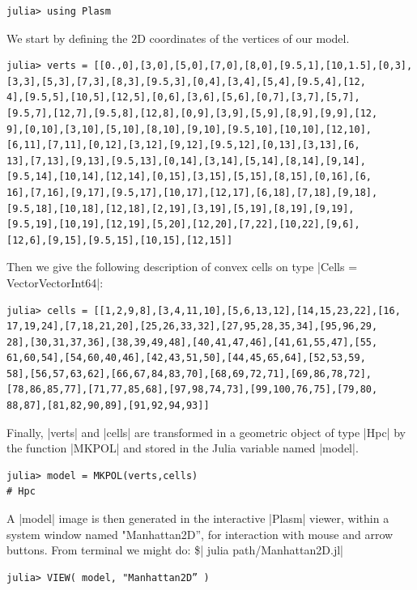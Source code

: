 \begin{coding}
\begin{lstlisting}[language=JuliaLocal, style=julia, mathescape = true] 
julia> using Plasm
\end{lstlisting} 

We start by defining the 2D coordinates of the vertices of our model. 
\begin{lstlisting}[language=JuliaLocal, style=julia, mathescape = true] 
julia> verts = [[0.,0],[3,0],[5,0],[7,0],[8,0],[9.5,1],[10,1.5],[0,3],
[3,3],[5,3],[7,3],[8,3],[9.5,3],[0,4],[3,4],[5,4],[9.5,4],[12,
4],[9.5,5],[10,5],[12,5],[0,6],[3,6],[5,6],[0,7],[3,7],[5,7],
[9.5,7],[12,7],[9.5,8],[12,8],[0,9],[3,9],[5,9],[8,9],[9,9],[12,
9],[0,10],[3,10],[5,10],[8,10],[9,10],[9.5,10],[10,10],[12,10],
[6,11],[7,11],[0,12],[3,12],[9,12],[9.5,12],[0,13],[3,13],[6,
13],[7,13],[9,13],[9.5,13],[0,14],[3,14],[5,14],[8,14],[9,14],
[9.5,14],[10,14],[12,14],[0,15],[3,15],[5,15],[8,15],[0,16],[6,
16],[7,16],[9,17],[9.5,17],[10,17],[12,17],[6,18],[7,18],[9,18],
[9.5,18],[10,18],[12,18],[2,19],[3,19],[5,19],[8,19],[9,19],
[9.5,19],[10,19],[12,19],[5,20],[12,20],[7,22],[10,22],[9,6],
[12,6],[9,15],[9.5,15],[10,15],[12,15]]
\end{lstlisting}
Then we give the following description of convex cells on type |Cells = Vector{Vector{Int64}}|:
\begin{lstlisting}[language=JuliaLocal, style=julia, mathescape = true] 
julia> cells = [[1,2,9,8],[3,4,11,10],[5,6,13,12],[14,15,23,22],[16,
17,19,24],[7,18,21,20],[25,26,33,32],[27,95,28,35,34],[95,96,29,
28],[30,31,37,36],[38,39,49,48],[40,41,47,46],[41,61,55,47],[55,
61,60,54],[54,60,40,46],[42,43,51,50],[44,45,65,64],[52,53,59,
58],[56,57,63,62],[66,67,84,83,70],[68,69,72,71],[69,86,78,72],
[78,86,85,77],[71,77,85,68],[97,98,74,73],[99,100,76,75],[79,80,
88,87],[81,82,90,89],[91,92,94,93]]
\end{lstlisting}
Finally, |verts|  and |cells| are transformed in a geometric object of type |Hpc| 
by the function |MKPOL| and stored in the Julia variable named |model|.

\begin{lstlisting}[language=JuliaLocal, style=julia, mathescape = true] 
julia> model = MKPOL(verts,cells)
# Hpc
\end{lstlisting}
A |model| image is then generated in the interactive |Plasm| viewer, within a system window named "Manhattan2D”, for interaction with mouse and arrow buttons. From terminal we might do: \$| julia path/Manhattan2D.jl|
\begin{lstlisting}[language=JuliaLocal, style=julia, mathescape = true] 
julia> VIEW( model, "Manhattan2D” )
\end{lstlisting}

\end{coding}



